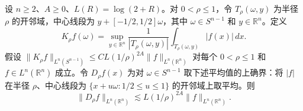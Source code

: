 设 \(n\ge2\)、\(A\ge0\)、\(L(R)=\log(2+R)\)。对 \(0<\rho\le1\)，令 \(T_\rho(\omega,y)\) 为半径 \(\rho\) 的开邻域，中心线段为 \(y+[-1/2,1/2]\omega\)，其中 \(\omega\in S^{n-1}\) 和 \(y\in\mathbb R^n\)。定义
\[
 K_\rho f(\omega)=\sup_{y\in\mathbb R^n}
 \frac{1}{|T_\rho(\omega,y)|}\int_{T_\rho(\omega,y)}|f(x)|\,dx .
\]
假设
\(\|K_\rho f\|_{L^n(S^{n-1})}\le C L(1/\rho)^{2A}\|f\|_{L^n(\mathbb R^n)}\)
对每个 \(0<\rho\le1\) 和 \(f\in L^n(\mathbb R^n)\) 成立。令 \(D_\rho f(x)\) 为对 \(\omega\in S^{n-1}\) 取下述平均值的上确界：将 \(|f|\) 在半径 \(\rho\)、中心线段为 \(\{x+u\omega:1/2\le u\le1\}\) 的开邻域上取平均。则
\[
 \|D_\rho f\|_{L^n(\mathbb R^n)}\lesssim L(1/\rho)^{2A}\|f\|_{L^n(\mathbb R^n)}.
\]
